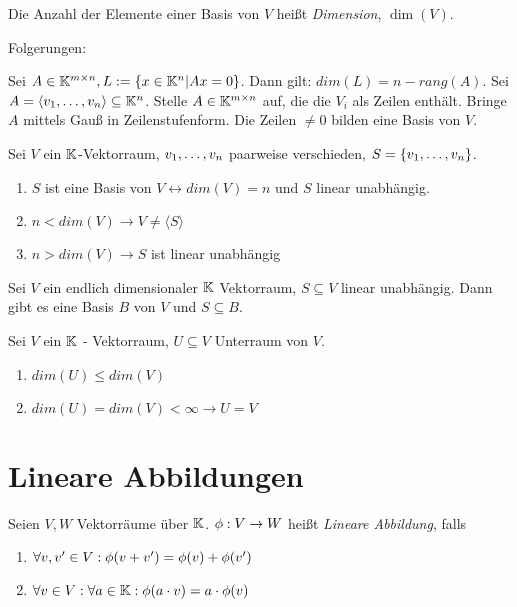 \begin{definition}[Dimension]
	Die Anzahl der Elemente einer Basis von $V$ heißt \emph{Dimension}, $\dim(V)$.
	
	Folgerungen:
	\begin{satz}
		Sei $A \in \mathbb{K}^{m \times n}, L := \{x \in \mathbb{K}^n | Ax = 0 \}$. Dann gilt: $dim(L) = n-rang(A)$. 
		Sei $A = \langle v_1, \dots, v_n \rangle \subseteq \mathbb{K}^n$. Stelle $A \in \mathbb{K}^{m \times n}$ auf, die die $V_i$ als Zeilen enthält. Bringe $A$ mittels Gauß in Zeilenstufenform. Die Zeilen $\neq 0$ bilden eine Basis von $V$. 
	\end{satz}
\end{definition}

\begin{satz}
	Sei $V$ ein $\mathbb{K}$-Vektorraum, $v_1, \dots, v_n$ paarweise verschieden, $S = \{v_1, \dots, v_n\}$.
	\begin{enumerate}[noitemsep]
		\item $S$ ist eine Basis von $V \leftrightarrow dim(V) = n$ und $S$ linear unabhängig.
		\item $n < dim(V) \rightarrow V \neq \langle S \rangle$
		\item $n > dim(V) \rightarrow S$ ist linear unabhängig 
	\end{enumerate}
\end{satz}

\begin{satz}[Basisergänzungssatz]
	Sei $V$ ein endlich dimensionaler $\mathbb{K}$ Vektorraum, $S \subseteq V$ linear unabhängig. Dann gibt es eine Basis $B$ von $V$ und $S \subseteq B$.
\end{satz}

\begin{satz}
	Sei $V$ ein $\mathbb{K}$ - Vektorraum, $U \subseteq V$ Unterraum von $V$.
	\begin{enumerate}[noitemsep]
		\item $dim(U) \leq dim(V)$
		\item $dim (U) = dim(V) < \infty \rightarrow U = V$
	\end{enumerate}
\end{satz}

\section{Lineare Abbildungen}

\begin{definition}
	Seien $V, W$ Vektorräume über $\mathbb{K}$. $\phi : V \rightarrow W$ heißt \emph{Lineare Abbildung}, falls
	\begin{enumerate}[noitemsep]
		\item $\forall v, v' \in V: \phi(v + v') = \phi(v) + \phi(v')$
		\item $\forall v \in V: \forall a \in \mathbb{K}: \phi(a \cdot v) = a \cdot \phi(v)$
	\end{enumerate}
\end{definition}

